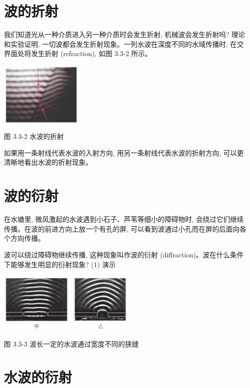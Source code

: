 \documentclass[10pt]{article}
\begin{document}
\section*{波的折射}

我们知道光从一种介质进入另一种介质时会发生折射, 机械波会发生折射吗? 理论和实验证明, 一切波都会发生折射现象。一列水波在深度不同的水域传播时, 在交界面处将发生折射 (refraction), 如图 3.3-2 所示。

\begin{center}
\includegraphics[max width=0.3\textwidth]{images/01910e4c-ebb8-7d2c-8f2f-2375bc1d2d12_77_919307.jpg}
\end{center}

图 3.3-2 水波的折射

如果用一条射线代表水波的入射方向, 用另一条射线代表水波的折射方向, 可以更清晰地看出水波的折射现象。

\section*{波的衍射}

在水塘里, 微风激起的水波遇到小石子、芦苇等细小的障碍物时, 会绕过它们继续传播。在波的前进方向上放一个有孔的屏, 可以看到波通过小孔而在屏的后面向各个方向传播。

波可以绕过障碍物继续传播, 这种现象叫作波的衍射 (diffraction)。波在什么条件下能够发生明显的衍射现象? (1) 演示

\begin{center}
\includegraphics[max width=0.5\textwidth]{images/01910e4c-ebb8-7d2c-8f2f-2375bc1d2d12_77_216945.jpg}
\end{center}

图 3.3-3 波长一定的水波通过宽度不同的狭缝

\section*{水波的衍射}
\end{document}
